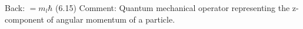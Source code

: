 \documentclass{article}
\begin{document}
\pagecolor{white} %
\centering
 Back: \( = m_l\hbar \) (6.15)  Comment: Quantum mechanical operator representing the z-component of angular momentum of a particle.
\end{document}

